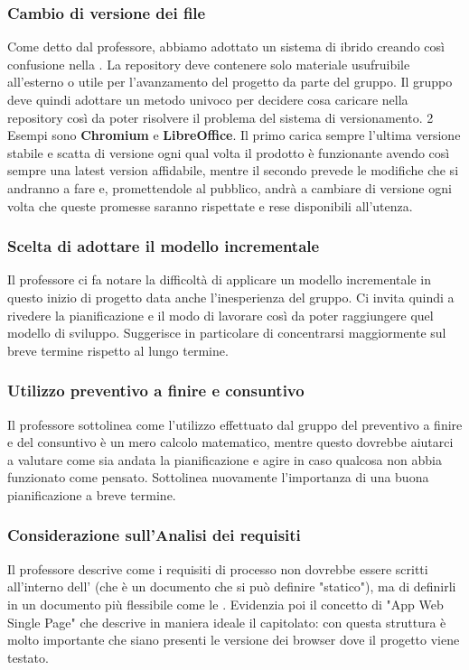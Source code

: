 \subsubsection{Cambio di versione dei file}
Come detto dal professore, abbiamo adottato un sistema di  ibrido creando così confusione nella . La repository deve contenere solo materiale usufruibile all'esterno o utile per l'avanzamento del progetto da parte del gruppo. Il gruppo deve quindi adottare un metodo univoco per decidere cosa caricare nella repository così da poter risolvere il problema del sistema di versionamento.
2 Esempi sono \textbf{Chromium} e \textbf{LibreOffice}. Il primo carica sempre l'ultima versione stabile e scatta di versione ogni qual volta il prodotto è funzionante avendo così sempre una latest version affidabile, mentre il secondo prevede le modifiche che si andranno a fare e, promettendole al pubblico, andrà a cambiare di versione ogni volta che queste promesse saranno rispettate e rese disponibili all'utenza.
\subsubsection{Scelta di adottare il modello incrementale}
Il professore ci fa notare la difficoltà di applicare un modello incrementale in questo inizio di progetto data anche l'inesperienza del gruppo. Ci invita quindi a rivedere la pianificazione e il modo di lavorare così da poter raggiungere quel modello di sviluppo. Suggerisce in particolare di concentrarsi maggiormente sul breve termine rispetto al lungo termine.
\subsubsection{Utilizzo preventivo a finire e consuntivo}
Il professore sottolinea come l'utilizzo effettuato dal gruppo del preventivo a finire e del consuntivo è un mero calcolo matematico, mentre questo dovrebbe aiutarci a valutare come sia andata la pianificazione e agire in caso qualcosa non abbia funzionato come pensato. Sottolinea nuovamente l'importanza di una buona pianificazione a breve termine.
\subsubsection{Considerazione sull'Analisi dei requisiti}
Il professore descrive come i requisiti di processo non dovrebbe essere scritti all'interno dell'\AdR{} (che è un documento che si può definire "statico"), ma di definirli in un documento più flessibile come le \NdP{}. Evidenzia poi il concetto di "App Web Single Page" che descrive in maniera ideale il capitolato: con questa struttura è molto importante che siano presenti le versione dei browser dove il progetto viene testato.
